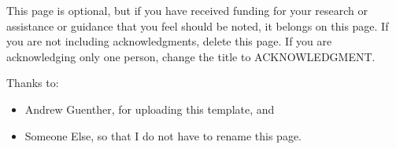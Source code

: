 This page is optional, but if you have received funding for your research or assistance or guidance that you feel should be noted, it belongs on this page. If you are not including acknowledgments, delete this page. If you are acknowledging only one person, change the title to ACKNOWLEDGMENT.

Thanks to:
\begin{itemize}
    \item Andrew Guenther, for uploading this template, and
    \item Someone Else, so that I do not have to rename this page.
\end{itemize}
